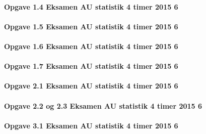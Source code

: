 \documentclass[]{book}
\let\oldparagraph\paragraph
\renewcommand{\paragraph}[1]{\oldparagraph{#1}\mbox{}}
\begin{document}
\hypertarget{opgave-1.4-eksamen-au-statistik-4-timer-2015-6}{%
\paragraph{Opgave 1.4 Eksamen AU statistik 4 timer 2015 6}\label{opgave-1.4-eksamen-au-statistik-4-timer-2015-6}}

\hypertarget{opgave-1.5-eksamen-au-statistik-4-timer-2015-6}{%
\paragraph{Opgave 1.5 Eksamen AU statistik 4 timer 2015 6}\label{opgave-1.5-eksamen-au-statistik-4-timer-2015-6}}

\hypertarget{opgave-1.6-eksamen-au-statistik-4-timer-2015-6}{%
\paragraph{Opgave 1.6 Eksamen AU statistik 4 timer 2015 6}\label{opgave-1.6-eksamen-au-statistik-4-timer-2015-6}}

\hypertarget{opgave-1.7-eksamen-au-statistik-4-timer-2015-6}{%
\paragraph{Opgave 1.7 Eksamen AU statistik 4 timer 2015 6}\label{opgave-1.7-eksamen-au-statistik-4-timer-2015-6}}

\hypertarget{opgave-2.1-eksamen-au-statistik-4-timer-2015-6}{%
\paragraph{Opgave 2.1 Eksamen AU statistik 4 timer 2015 6}\label{opgave-2.1-eksamen-au-statistik-4-timer-2015-6}}

\hypertarget{opgave-2.2-og-2.3-eksamen-au-statistik-4-timer-2015-6}{%
\paragraph{Opgave 2.2 og 2.3 Eksamen AU statistik 4 timer 2015 6}\label{opgave-2.2-og-2.3-eksamen-au-statistik-4-timer-2015-6}}

\hypertarget{opgave-3.1-eksamen-au-statistik-4-timer-2015-6}{%
\paragraph{Opgave 3.1 Eksamen AU statistik 4 timer 2015 6}\label{opgave-3.1-eksamen-au-statistik-4-timer-2015-6}}
\end{document}
